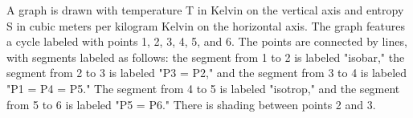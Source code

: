 A graph is drawn with temperature T in Kelvin on the vertical axis and entropy S in cubic meters per kilogram Kelvin on the horizontal axis. The graph features a cycle labeled with points 1, 2, 3, 4, 5, and 6. The points are connected by lines, with segments labeled as follows: the segment from 1 to 2 is labeled "isobar," the segment from 2 to 3 is labeled "P3 = P2," and the segment from 3 to 4 is labeled "P1 = P4 = P5." The segment from 4 to 5 is labeled "isotrop," and the segment from 5 to 6 is labeled "P5 = P6." There is shading between points 2 and 3.